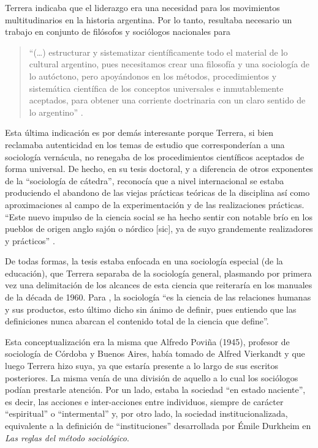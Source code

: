 Terrera indicaba que el liderazgo era una necesidad para los movimientos multitudinarios en la historia argentina. Por lo tanto, resultaba necesario un trabajo en conjunto de filósofos y sociólogos nacionales para

\begin{quote}
\enquote{(\dots) estructurar y sistematizar científicamente todo el material de lo cultural argentino, pues necesitamos crear una filosofía y una sociología de lo autóctono, pero apoyándonos en los métodos, procedimientos y sistemática científica de los conceptos universales e inmutablemente aceptados, para obtener una corriente doctrinaria con un claro sentido de lo argentino} \parencite[33-34]{1713-TERRERA1949}.
\end{quote}

Esta última indicación es por demás interesante porque Terrera, si bien reclamaba autenticidad en los temas de estudio que corresponderían a una sociología vernácula, no renegaba de los procedimientos científicos aceptados de forma universal. De hecho, en su tesis doctoral, y a diferencia de otros exponentes de la \enquote{sociología de cátedra}, reconocía que a nivel internacional se estaba produciendo el abandono de las viejas prácticas teóricas de la disciplina así como aproximaciones al campo de la experimentación y de las realizaciones prácticas. \enquote{Este nuevo impulso de la ciencia social se ha hecho sentir con notable brío en los pueblos de origen anglo sajón o nórdico [sic], ya de suyo grandemente realizadores y prácticos} \parencite[11]{1714-TERRERA1950}.

De todas formas, la tesis estaba enfocada en una sociología especial (de la educación), que Terrera separaba de la sociología general, plasmando por primera vez una delimitación de los alcances de esta ciencia que reiteraría en los manuales de la década de 1960. Para \textcite[14]{1714-TERRERA1950}, la sociología \enquote{es la ciencia de las relaciones humanas y sus productos, esto último dicho sin ánimo de definir, pues entiendo que las definiciones nunca abarcan el contenido total de la ciencia que define}.

Esta conceptualización era la misma que Alfredo Poviña (1945), profesor de sociología de Córdoba y Buenos Aires, había tomado de Alfred Vierkandt y que luego Terrera hizo suya, ya que estaría presente a lo largo de sus escritos posteriores. La misma venía de una división de aquello a lo cual los sociólogos podían prestarle atención. Por un lado, estaba la sociedad \enquote{en estado naciente}, es decir, las acciones e inter-acciones entre individuos, siempre de carácter \enquote{espiritual} o \enquote{intermental} y, por otro lado, la sociedad institucionalizada, equivalente a la definición de \enquote{instituciones} desarrollada por Émile Durkheim en \emph{Las reglas del método sociológico}.

